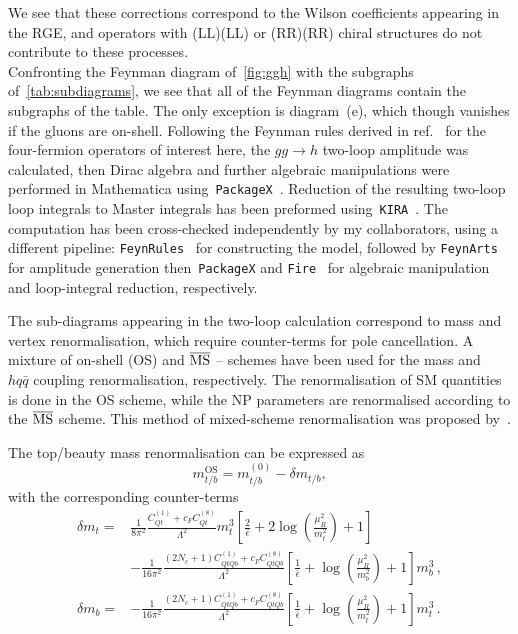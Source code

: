 	\par We see that these corrections correspond to the Wilson coefficients appearing in the RGE, and operators with (LL)(LL) or (RR)(RR) chiral structures do not contribute to these processes. \\ Confronting the Feynman diagram of~\autoref{fig:ggh} with the subgraphs of~\autoref{tab:subdiagrams}, we see that all of the Feynman diagrams contain the subgraphs of the table. The only exception is diagram~(e), which though vanishes if the gluons are on-shell.
	Following the Feynman rules derived in ref.~\cite{Dedes:2017zog} for the four-fermion operators of interest here, the $ gg \to h$ two-loop amplitude was calculated, then Dirac algebra and further algebraic manipulations were performed in Mathematica using~\texttt{PackageX}~\cite{Patel:2015tea}. Reduction of the resulting two-loop loop integrals to Master integrals has been preformed using~\texttt{KIRA}~\cite{Maierhoefer:2017hyi}. The computation has been cross-checked independently by my collaborators, using a different pipeline: \texttt{FeynRules}~\cite{Alloul:2013bka} for constructing the model, followed by \texttt{FeynArts}~\cite{Hahn:2000kx} for amplitude generation then~\texttt{PackageX} and  \texttt{Fire}~\cite{Smirnov:2008iw} for algebraic manipulation and loop-integral reduction, respectively.\\
	\par
	The sub-diagrams appearing in the two-loop calculation correspond to mass and vertex renormalisation, which require counter-terms for pole cancellation. A mixture of  on-shell (OS) and $\overline{\mathrm{MS}}$ -- schemes have been used for the mass and ~$h q \bar{q}$ coupling renormalisation, respectively. The renormalisation of SM quantities is  done in the OS scheme, while the NP parameters are renormalised according to the $\overline{\mathrm{MS}}$ scheme. This method of mixed-scheme renormalisation was proposed by~\cite{Dawson:2018pyl}.
	\par The top/beauty mass renormalisation can be expressed as  
	\begin{equation}
		m_{t/b}^{\text{OS}}=m_{t/b}^{(0)}-\delta m_{t/b},
	\end{equation}
	with the corresponding counter-terms
	\begin{align}
		\delta m_t =&\frac{1}{8 \pi^2} \frac{C_{Qt}^{(1)}+c_F C_{Qt}^{(8)}}{\Lambda^2}m_t^3\left[ \frac{2}{\bar{\epsilon}} +2 \log\left(\frac{\mu_R^2}{m_t^2}\right)+1\right] \\ &- \frac{1}{16 \pi^2}  \frac{(2 N_c+1) C_{QtQb}^{(1)}+c_F C_{QtQb}^{(8)}}{\Lambda^2}  \left[ \frac{1}{\bar{\epsilon}} +  \log\left(\frac{\mu_R^2}{m_b^2}\right)+1 \right]  m_b^3\,, \nonumber \\
		\delta m_b=&-\frac{1}{16 \pi^2} \frac{(2 N_c+1)C_{QtQb}^{(1)}+c_F C_{QtQb}^{(8)}}{\Lambda^2}\left[ \frac{1}{\bar{\epsilon}} +\log\left( \frac{\mu_R^2}{m_t^2}\right)+1\right] m_t^3\,.
	\end{align}
